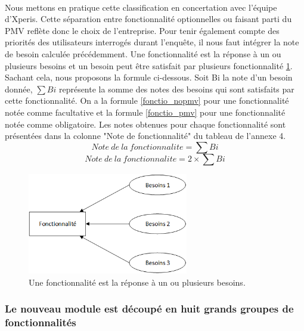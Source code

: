 			\paragraph{}%
			Nous mettons en pratique cette classification en concertation avec l'équipe
			d'Xperis. Cette séparation entre fonctionnalité optionnelles ou faisant parti
			du PMV reflète donc le choix de l'entreprise.
			Pour tenir également compte des priorités des utilisateurs interrogés durant
			l'enquête, il nous faut intégrer la note de besoin calculée précédemment. Une
			fonctionnalité est la réponse à un ou plusieurs besoins et un besoin peut
			être satisfait par plusieurs fonctionnalité \ref{mapping_besoins}. Sachant
			cela, nous proposons la formule ci-dessous.
			Soit Bi la note d'un besoin donnée, \begin{math}\sum Bi\end{math} représente la somme des notes des besoins qui
			sont satisfaits par cette fonctionnalité. On a la formule \ref{fonctio_nopmv}
			pour une fonctionnalité notée comme facultative et la formule
			\ref{fonctio_pmv} pour une fonctionnalité notée comme obligatoire. Les notes
			obtenues pour chaque fonctionnalité sont présentées dans la colonne "Note
			de fonctionnalité" du tableau de l'annexe 4.
			\begin{equation}
				\label{fonctio_nopmv}
				Note\ de\ la\ fonctionnalite=\sum Bi
			\end{equation}
			\begin{equation}
				\label{fonctio_pmv}
				Note\ de\ la\ fonctionnalite=2\times \sum Bi
			\end{equation}
			\begin{figure}[H]
				\centering
				\includegraphics[width=7cm]{../img/part2/mapping_besoins.png}
				\caption{\label{mapping_besoins} Une fonctionnalité est la réponse à un ou
				plusieurs besoins.}
			\end{figure}
			
		\subsubsection{Le nouveau module est découpé en huit grands groupes de
		fonctionnalités}
